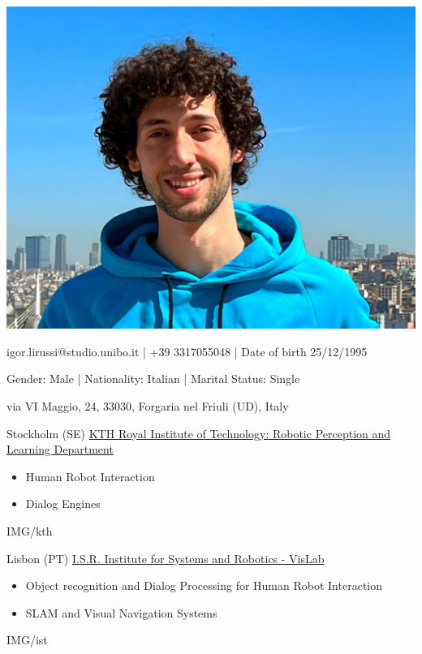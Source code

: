 \documentclass[paper=a4,fontsize=11pt]{temp} %
\begin{document}
\begin{minipage}{.2\linewidth}
   \includegraphics[width=1\textwidth]{photo}
\end{minipage}      
\begin{minipage}{0.7\linewidth}
   \sepspace
   \noindent
   \hfill igor.lirussi@studio.unibo.it | +39 3317055048 | Date of birth 25/12/1995
   
   \hfill Gender: Male | Nationality: Italian | Marital Status: Single
   
   \hfill via VI Maggio, 24, 33030, Forgaria nel Friuli (UD), Italy
 
\end{minipage}


\noindent

{Stockholm (SE) \href{https://www.kth.se/is/rpl}{KTH Royal Institute of Technology: Robotic Perception and Learning Department}}
{
 \begin{itemize}
    \item Human Robot Interaction
    \item Dialog Engines
 \end{itemize}
} {IMG/kth}

\sepspace

{Lisbon (PT) \href{https://welcome.isr.tecnico.ulisboa.pt/}{ I.S.R. Institute for Systems and Robotics - VisLab}}
{
 \begin{itemize}
    \item Object recognition and Dialog Processing for Human Robot Interaction
    \item SLAM and Visual Navigation Systems
 \end{itemize}
} {IMG/ist}
\end{document}
